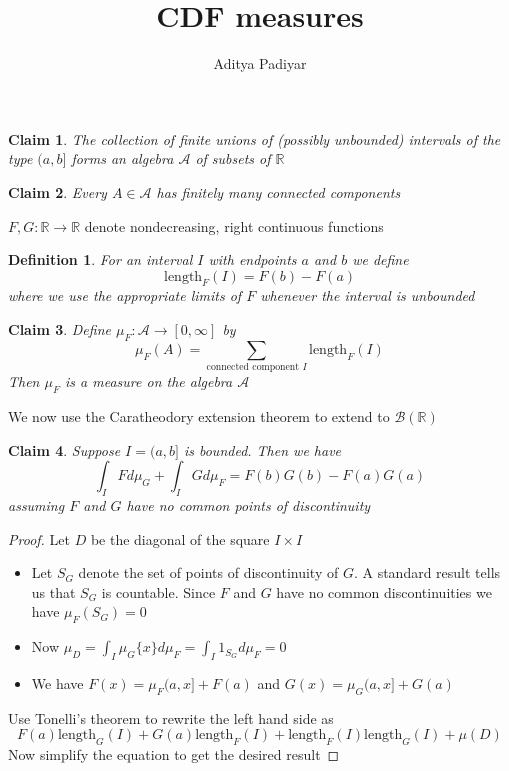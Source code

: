 \documentclass[a4paper,11pt]{article}
\title{CDF measures}
\author{Aditya Padiyar}
\newtheorem{claim}{Claim}
\newtheorem{definition}{Definition}
\begin{document}
\maketitle

\begin{claim}
  The collection of finite unions of (possibly unbounded) intervals of the type $(a,b]$ forms an algebra $\mathcal{A}$ of subsets of $\mathbb{R}$
\end{claim}

\begin{claim}
  Every $A \in \mathcal{A}$ has finitely many connected components
\end{claim}

$F,G:\mathbb{R} \to \mathbb{R}$ denote nondecreasing, right continuous functions

\begin{definition}
  For an interval $I$ with endpoints $a$ and $b$ we define \[\text{length}_F(I)=F(b)-F(a)\] where we use the appropriate limits of $F$ whenever the interval is unbounded
\end{definition}

\begin{claim}
  Define $\mu_F:\mathcal{A} \to [0,\infty]$ by \[\mu_F(A)=\sum_{\text{connected component } I } \text{length}_F(I)\] 
  Then $\mu_F$ is a measure on the algebra $\mathcal{A}$
\end{claim}

We now use the Caratheodory extension theorem to extend to $\mathcal{B}(\mathbb{R})$

\begin{claim}
  Suppose $I=(a,b]$ is bounded. Then we have \[\int_I F d\mu_G + \int_I G d \mu_F=F(b)G(b)-F(a)G(a)\] assuming $F$ and $G$ have no common points of discontinuity
\end{claim}

\begin{proof}
  Let $D$ be the diagonal of the square $I \times I$
  
  \begin{itemize}
    \item Let $S_G$ denote the set of points of discontinuity of $G$. A standard result tells us that $S_G$ is countable. Since $F$ and $G$ have no common discontinuities we have $\mu_F(S_G)=0$
    \item Now $\mu_D=\int_I \mu_G\{x\} d\mu_F=\int_I 1_{S_G} d\mu_F = 0$
    \item We have $F(x)=\mu_F(a,x] + F(a)$ and $G(x)=\mu_G(a,x]+G(a)$
  \end{itemize}
  
  Use Tonelli's theorem to rewrite the left hand side as 
  \[F(a)\text{length}_G(I)+G(a)\text{length}_F(I)+\text{length}_F(I)\text{length}_G(I)+\mu(D)\]
  Now simplify the equation to get the desired result
\end{proof}
\end{document}
